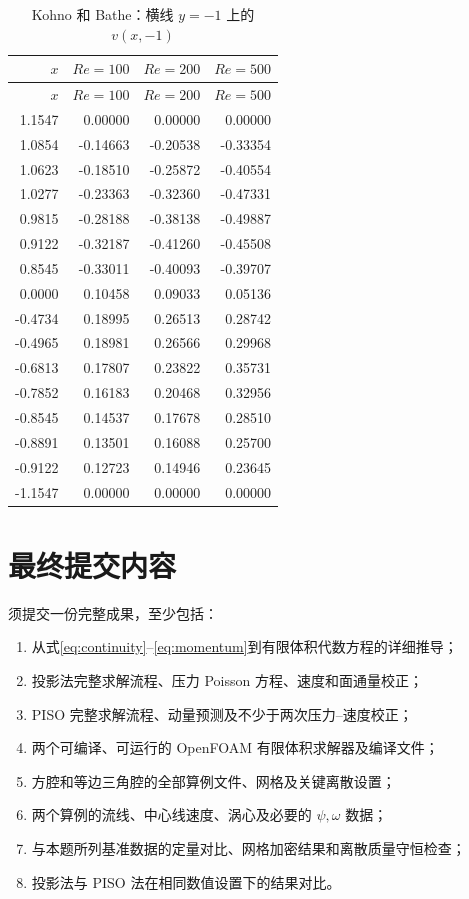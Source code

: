 \documentclass[UTF8,a4paper,11pt]{ctexart}
\begin{document}
\begin{longtable}{r|rrr}
\caption{Kohno 和 Bathe\cite{Kohno2006}：横线 \(y=-1\) 上的 \(v(x,-1)\)}
\label{tab:tri-v}\\
\toprule
\(x\) & \(Re=100\) & \(Re=200\) & \(Re=500\) \\
\midrule
\endfirsthead
\toprule
\(x\) & \(Re=100\) & \(Re=200\) & \(Re=500\) \\
\midrule
\endhead
1.1547  & 0.00000 & 0.00000 & 0.00000 \\
1.0854  & -0.14663 & -0.20538 & -0.33354 \\
1.0623  & -0.18510 & -0.25872 & -0.40554 \\
1.0277  & -0.23363 & -0.32360 & -0.47331 \\
0.9815  & -0.28188 & -0.38138 & -0.49887 \\
0.9122  & -0.32187 & -0.41260 & -0.45508 \\
0.8545  & -0.33011 & -0.40093 & -0.39707 \\
0.0000  & 0.10458 & 0.09033 & 0.05136 \\
-0.4734 & 0.18995 & 0.26513 & 0.28742 \\
-0.4965 & 0.18981 & 0.26566 & 0.29968 \\
-0.6813 & 0.17807 & 0.23822 & 0.35731 \\
-0.7852 & 0.16183 & 0.20468 & 0.32956 \\
-0.8545 & 0.14537 & 0.17678 & 0.28510 \\
-0.8891 & 0.13501 & 0.16088 & 0.25700 \\
-0.9122 & 0.12723 & 0.14946 & 0.23645 \\
-1.1547 & 0.00000 & 0.00000 & 0.00000 \\
\bottomrule
\end{longtable}

\section{最终提交内容}

须提交一份完整成果，至少包括：

\begin{enumerate}[label=\arabic*.]
  \item 从式\eqref{eq:continuity}--\eqref{eq:momentum}到有限体积代数方程的详细推导；
  \item 投影法完整求解流程、压力 Poisson 方程、速度和面通量校正；
  \item PISO 完整求解流程、动量预测及不少于两次压力--速度校正；
  \item 两个可编译、可运行的 OpenFOAM 有限体积求解器及编译文件；
  \item 方腔和等边三角腔的全部算例文件、网格及关键离散设置；
  \item 两个算例的流线、中心线速度、涡心及必要的 \(\psi,\omega\) 数据；
  \item 与本题所列基准数据的定量对比、网格加密结果和离散质量守恒检查；
  \item 投影法与 PISO 法在相同数值设置下的结果对比。
\end{enumerate}
\end{document}
